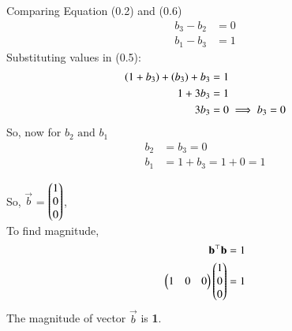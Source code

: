 \documentclass[journal]{IEEEtran}
\begin{document}
Comparing Equation (0.2) and (0.6)
	\begin{align}
		b_3 - b_2 &= 0   \\
		b_1 - b_3 &= 1 
	\end{align}
Substituting values in (0.5):
		\begin{align}
			\left(1 + b_3\right) + \left(b_3\right) + b_3 &= 1 \\
			1 + 3b_3 &= 1 \\
			3b_3 &= 0 \implies b_3 = 0
		\end{align}
So, now for $b_2 \text{ and } b_1$
		\begin{align}
			b_2 &= b_3 = 0 \\
			b_1 &= 1 + b_3 = 1 + 0 = 1
		\end{align}

	So,  $\vec{b}$ = $\begin{pmatrix}1 \\ 0 \\ 0\end{pmatrix}$,\\
	To find magnitude,
	\begin{align}
		\mathbf{b}^\top \mathbf{b} = 1 \\
		\begin{pmatrix} 1 & 0 & 0 \end{pmatrix} \begin{pmatrix}1 \\ 0 \\ 0\end{pmatrix} = 1
	\end{align}
The magnitude of vector $\vec{b}$ is \textbf{1}.
	
\end{document}
